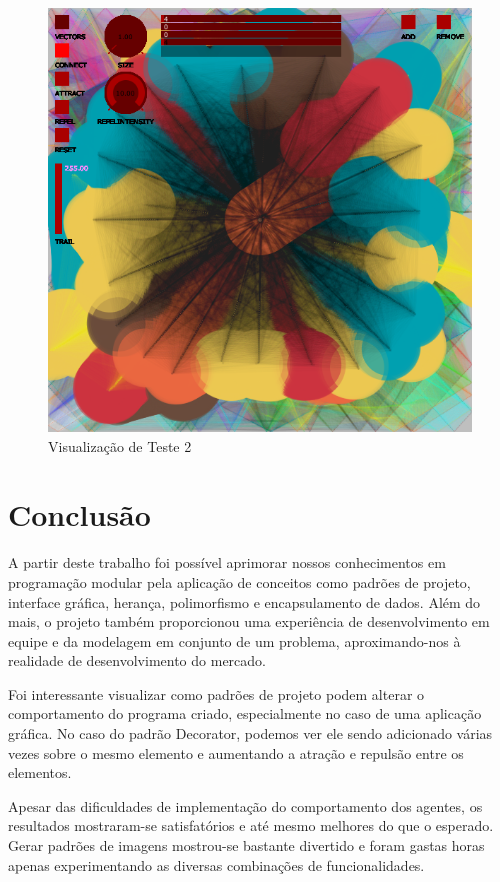 \documentclass[12pt]{article}
\begin{document}
\begin{figure}[h!]
	\centering
	\includegraphics[width=.8\textwidth]{teste2.png}
	\caption{Visualização de Teste 2}
	\label{umlfull}
\end{figure}

\section{Conclusão}
\label{conclusao}

A partir deste trabalho foi possível aprimorar nossos conhecimentos em programação modular pela aplicação de conceitos como padrões de projeto, interface gráfica, herança, polimorfismo e encapsulamento de dados. Além do mais, o projeto também proporcionou uma experiência de desenvolvimento em equipe e da modelagem em conjunto de um problema, aproximando-nos à realidade de desenvolvimento do mercado.

Foi interessante visualizar como padrões de projeto podem alterar o comportamento do programa criado, especialmente no caso de uma aplicação gráfica. No caso do padrão Decorator, podemos ver ele sendo adicionado várias vezes sobre o mesmo elemento e aumentando a atração e repulsão entre os elementos.

Apesar das dificuldades de implementação do comportamento dos agentes, os resultados mostraram-se satisfatórios e até mesmo melhores do que o esperado. Gerar padrões de imagens mostrou-se bastante divertido e foram gastas horas apenas experimentando as diversas combinações de funcionalidades. \cite{github}




\end{document}
